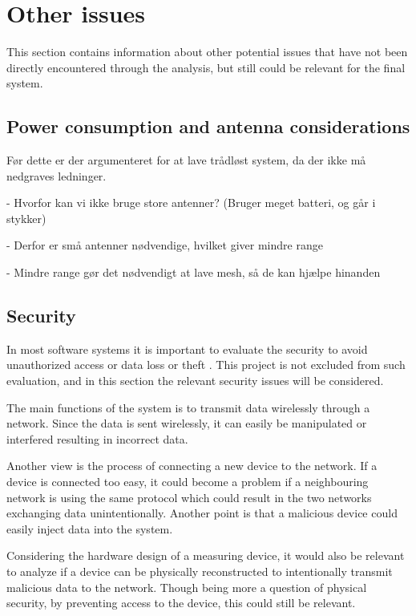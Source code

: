 \section{Other issues}
This section contains information about other potential issues that have not been directly encountered through the analysis, but still could be relevant for the final system.

\subsection{Power consumption and antenna considerations}
Før dette er der argumenteret for at lave trådløst system, da der ikke må nedgraves ledninger.

- Hvorfor kan vi ikke bruge store antenner? (Bruger meget batteri, og går i stykker)

- Derfor er små antenner nødvendige, hvilket giver mindre range

- Mindre range gør det nødvendigt at lave mesh, så de kan hjælpe hinanden

\subsection{Security}
In most software systems it is important to evaluate the security to avoid unauthorized access or data loss or theft . This project is not excluded from such evaluation, and in this section the relevant security issues will be considered.

The main functions of the system is to transmit data wirelessly through a network. Since the data is sent wirelessly, it can easily be manipulated or interfered resulting in incorrect data.

Another view is the process of connecting a new device to the network. If a device is connected too easy, it could become a problem if a neighbouring network is using the same protocol which could result in the two networks exchanging data unintentionally. Another point is that a malicious device could easily inject data into the system.

Considering the hardware design of a measuring device, it would also be relevant to analyze if a device can be physically reconstructed to intentionally transmit malicious data to the network. Though being more a question of physical security, by preventing access to the device, this could still be relevant.

